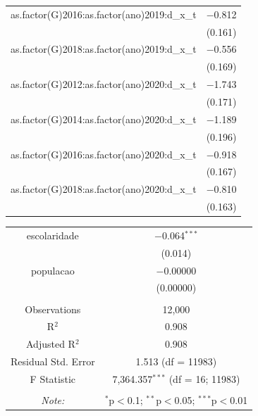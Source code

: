 \documentclass[portugues]{article}
\begin{document}
\begin{box_code}
\begin{center}
\begin{tabular}{@{\extracolsep{5pt}}cc}
         as.factor(G)2016:as.factor(ano)2019:d\_x\_t & $-$0.812 \\ 
          & (0.161) \\ 
         as.factor(G)2018:as.factor(ano)2019:d\_x\_t & $-$0.556 \\ 
          & (0.169) \\ 
         as.factor(G)2012:as.factor(ano)2020:d\_x\_t & $-$1.743 \\ 
          & (0.171) \\ 
         as.factor(G)2014:as.factor(ano)2020:d\_x\_t & $-$1.189 \\ 
          & (0.196) \\ 
         as.factor(G)2016:as.factor(ano)2020:d\_x\_t & $-$0.918 \\ 
          & (0.167) \\ 
         as.factor(G)2018:as.factor(ano)2020:d\_x\_t & $-$0.810 \\ 
          & (0.163) \\ 
            \end{tabular} 
        \end{center}
     \endgroup

        \begingroup
        \fontsize{8pt}{12pt}\selectfont
        \begin{center}
         \begin{tabular}{@{\extracolsep{5pt}}cc} 
         escolaridade & $-$0.064$^{***}$ \\ 
          & (0.014) \\ 
         populacao & $-$0.00000 \\ 
          & (0.00000) \\ 
         \hline \\[-1.8ex] 
         Observations & 12,000 \\ 
         R$^{2}$ & 0.908 \\ 
         Adjusted R$^{2}$ & 0.908 \\ 
         Residual Std. Error & 1.513 (df = 11983) \\ 
         F Statistic & 7,364.357$^{***}$ (df = 16; 11983) \\ 
         \hline 
         \hline \\[-1.8ex] 
                 \textit{Note:}  & \multicolumn{1}{r}{$^{*}$p$<$0.1; $^{**}$p$<$0.05; $^{***}$p$<$0.01} \\
            \end{tabular} 
        \end{center}
     \endgroup

\end{box_code}
\end{document}
